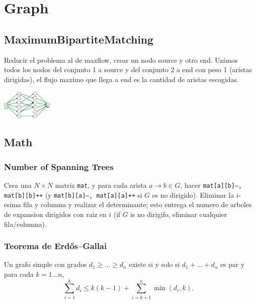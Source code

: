 \chapter{Graph}
\section{MaximumBipartiteMatching}
Reducir el problema al de maxflow, crear un nodo source y otro end. Unimos todos los nodos del conjunto 1 a source y del conjunto 2 a end con peso 1 (aristas dirigidas), el flujo maximo que llega a end es la cantidad de aristas escogidas.
\begin{center}
\includegraphics[width=25mm]{content/graph/maximum_matching.png}
\end{center}
\section{Math}
	\subsection{Number of Spanning Trees}
		Crea una $N\times N$ matriz \texttt{mat}, y para cada arista $a \rightarrow b \in G$, hacer
		\texttt{mat[a][b]--, mat[b][b]++} (y \texttt{mat[b][a]--, mat[a][a]++} si $G$ es no dirigido).
		Eliminar la $i$-esima fila y columna y realizar el determinante; esto entrega el numero de arboles de expansion dirigidos con raiz en $i$
		(if $G$ is no dirigifo, eliminar cualquier fila/columna).

	\subsection{Teorema de Erdős–Gallai}
		Un grafo simple con grados $d_1 \ge \dots \ge d_n$ existe si y solo si $d_1 + \dots + d_n$ es par y para cada $k = 1\dots n$,
		\[ \sum _{i=1}^{k}d_{i}\leq k(k-1)+\sum _{i=k+1}^{n}\min(d_{i},k). \]
